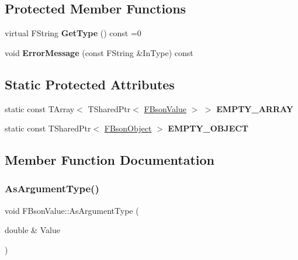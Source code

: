 \subsection*{Protected Member Functions}
\begin{DoxyCompactItemize}
\item 
\mbox{\label{class_f_bson_value_a6d3d6215d2ffd55c1445849b70dad5b5}} 
virtual F\+String {\bfseries Get\+Type} () const =0
\item 
\mbox{\label{class_f_bson_value_aa2f02c007e7ce6b465f328ded94cc66b}} 
void {\bfseries Error\+Message} (const F\+String \&In\+Type) const
\end{DoxyCompactItemize}
\subsection*{Static Protected Attributes}
\begin{DoxyCompactItemize}
\item 
\mbox{\label{class_f_bson_value_a2b096906cada9314e9d4e42d723d2e8d}} 
static const T\+Array$<$ T\+Shared\+Ptr$<$ \mbox{\hyperlink{class_f_bson_value}{F\+Bson\+Value}} $>$ $>$ {\bfseries E\+M\+P\+T\+Y\+\_\+\+A\+R\+R\+AY}
\item 
\mbox{\label{class_f_bson_value_ac8abc326f63430015e2392e0abb6fd62}} 
static const T\+Shared\+Ptr$<$ \mbox{\hyperlink{class_f_bson_object}{F\+Bson\+Object}} $>$ {\bfseries E\+M\+P\+T\+Y\+\_\+\+O\+B\+J\+E\+CT}
\end{DoxyCompactItemize}


\subsection{Member Function Documentation}
\mbox{\label{class_f_bson_value_a2776e2dccc09e36f42f5bc7f0412f79c}} 
\subsubsection{\texorpdfstring{As\+Argument\+Type()}{AsArgumentType()}}
{\footnotesize\ttfamily void F\+Bson\+Value\+::\+As\+Argument\+Type (\begin{DoxyParamCaption}\item[{double \&}]{Value }\end{DoxyParamCaption})\hspace{0.3cm}{\ttfamily [inline]}}

